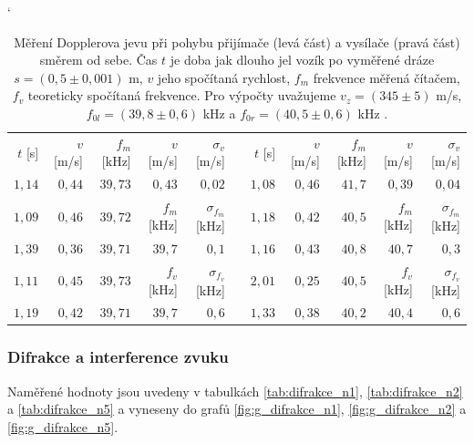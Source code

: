 \documentclass[english]{article}
\begin{document}
	
	\begin{table}[h]
	\catcode` %
	\begin{center}
	\begin{tabular}{|r|r|r||r|r|c|r|r|r||r|r|}
	\cline{1-5} \cline{7-11}
 	
 	$t$ [s] & $v$ [m/s] & $f_m$ [kHz] & $v$ [m/s] & $\sigma_v$ [m/s] && $t$ [s] & $v$ [m/s] & $f_m$ [kHz] & $v$ [m/s] & $\sigma_v$ [m/s] 	\\\cline{1-5} \cline{7-11}
	$1,14$ & $0,44$ & $39,73$ & $0,43$      & $0,02$                 && $1,08$ & $0,46$ & $41,7$ & $0,39$ & $0,04$ 							\\\cline{1-5} \cline{7-11}
	$1,09$ & $0,46$ & $39,72$ & $f_m$ [kHz] & $\sigma_{f_m}$ [kHz]   && $1,18$ & $0,42$ & $40,5$ & $f_m$ [kHz] & $\sigma_{f_m}$ [kHz]  		\\\cline{1-5} \cline{7-11}
	$1,39$ & $0,36$ & $39,71$ & $39,7$     & $0,1$                 && $1,16$ & $0,43$ & $40,8$ & $40,7$ & $0,3$ 							\\\cline{1-5} \cline{7-11}
	$1,11$ & $0,45$ & $39,73$ & $f_v$ [kHz] & $\sigma_{f_v}$ [kHz]   && $2,01$ & $0,25$ & $40,5$ & $f_v$ [kHz] & $\sigma_{f_v}$ [kHz]  		\\\cline{1-5} \cline{7-11}
	$1,19$ & $0,42$ & $39,71$ & $39,7$      & $0,6$                  && $1,33$ & $0,38$ & $40,2$ & $40,4$ & $0,6$ 							\\\cline{1-5} \cline{7-11}
	     
	\end{tabular}
	\caption{Měření Dopplerova jevu při pohybu přijímače (levá část) a vysílače (pravá část) směrem od sebe. Čas $t$ je doba jak dlouho jel vozík po vyměřené dráze $s = (0,5 \pm 0,001)$ m, $v$ jeho spočítaná rychlost, $f_m$ frekvence měřená čítačem, $f_v$ teoreticky spočítaná frekvence. Pro výpočty uvažujeme $v_z = (345 \pm 5)$ m/s, $f_{0l} = (39,8 \pm 0,6)$ kHz a $f_{0r} = (40,5 \pm 0,6)$ kHz \cite{bib:chyby}.
	}
	\label{tab:doppler_od_sebe}
	\end{center}
	\end{table}
	
	\subsubsection{Difrakce a interference zvuku}
		Naměřené hodnoty jsou uvedeny v tabulkách \ref{tab:difrakce_n1}, \ref{tab:difrakce_n2} a \ref{tab:difrakce_n5} a vyneseny do grafů \ref{fig:g_difrakce_n1}, \ref{fig:g_difrakce_n2} a \ref{fig:g_difrakce_n5}.
	
\end{document}
